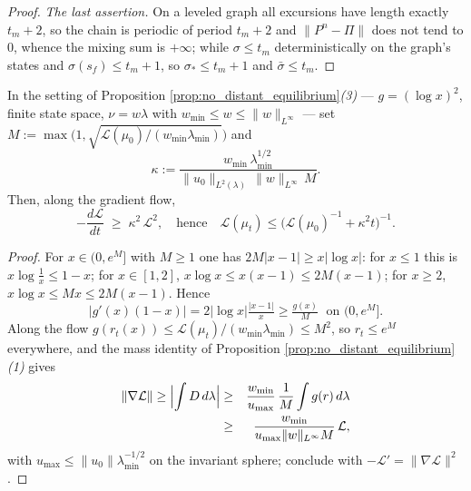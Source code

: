 \begin{proof}
\emph{The last assertion.} On a leveled graph all excursions have length exactly $t_m+2$, so the chain is periodic of period $t_m+2$ and $\|P^{n}-\Pi\|$ does not tend to $0$, whence the mixing sum is $+\infty$; while $\sigma\leq t_m$ deterministically on the graph's states and $\sigma(s_f)\leq t_m+1$, so $\sigma_*\leq t_m+1$ and $\bar\sigma\leq t_m$.
\end{proof}

\begin{corollary}\label{cor:global_lojasiewicz}
In the setting of Proposition \ref{prop:no_distant_equilibrium}\emph{(3)} --- $g=(\log x)^2$, finite state space, $\nu=w\lambda$ with $w_{\min}\leq w\leq\|w\|_{L^\infty}$ --- set $M:=\max\bigl(1,\sqrt{\mathcal L(\mu_0)/(w_{\min}\lambda_{\min})}\bigr)$ and
\begin{equation*}
\kappa:=\frac{w_{\min}\,\lambda_{\min}^{1/2}}{\|u_0\|_{L^2(\lambda)}\,\|w\|_{L^\infty}\,M}.
\end{equation*}
Then, along the gradient flow,
\begin{equation*}
    -\frac{d\mathcal L}{dt}\;\geq\;\kappa^2\,\mathcal L^2,
    \quad\text{hence}\quad
    \mathcal L(\mu_t)\leq\bigl(\mathcal L(\mu_0)^{-1}+\kappa^2 t\bigr)^{-1}.
\end{equation*}
\end{corollary}
\begin{proof}
For $x\in(0,e^{M}]$ with $M\geq1$ one has $2M|x-1|\geq x|\log x|$: for $x\leq1$ this is $x\log\frac1x\leq1-x$; for $x\in[1,2]$, $x\log x\leq x(x-1)\leq2M(x-1)$; for $x\geq2$, $x\log x\leq Mx\leq2M(x-1)$. Hence
\begin{equation*}
|g'(x)(1-x)|=2|\log x|\tfrac{|x-1|}x\geq\tfrac{g(x)}M \;\text{ on }(0,e^M].
\end{equation*}
Along the flow $g(r_t(x))\leq\mathcal L(\mu_t)/(w_{\min}\lambda_{\min})\leq M^2$, so $r_t\leq e^{M}$ everywhere, and the mass identity of Proposition \ref{prop:no_distant_equilibrium}\emph{(1)} gives
\begin{eqnarray*}
    \|\nabla\mathcal L\|\geq\Bigl|\int D\,d\lambda\Bigr|&\geq&\frac{w_{\min}}{u_{\max}}\,\frac1M\int g(r)\,d\lambda\\
    &\geq&\frac{w_{\min}}{u_{\max}\|w\|_{L^\infty}M}\,\mathcal L,
\end{eqnarray*}
with $u_{\max}\leq\|u_0\|\lambda_{\min}^{-1/2}$ on the invariant sphere; conclude with $-\mathcal L'=\|\nabla\mathcal L\|^2$.
\end{proof}

